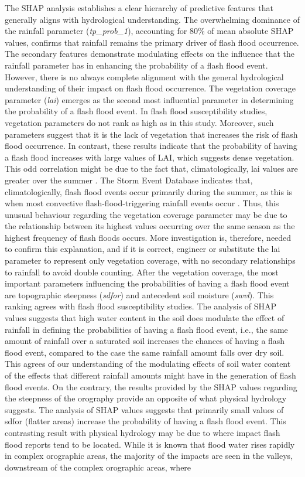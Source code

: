 \documentclass[nhess, manuscript]{copernicus}
\begin{document}
The SHAP analysis establishes a clear hierarchy of predictive features that generally aligns with hydrological understanding. The overwhelming dominance of the rainfall parameter (\textit{tp\_prob\_1}), accounting for 80\% of mean absolute SHAP values, confirms that rainfall remains the primary driver of flash flood occurrence. The secondary features demonstrate modulating effects on the influence that the rainfall parameter has in enhancing the probability of a flash flood event. However, there is no always complete alignment with the general hydrological understanding of their impact on flash flood occurrence. The vegetation coverage parameter (\textit{lai}) emerges as the second most influential parameter in determining the probability of a flash flood event. In flash flood susceptibility studies, vegetation parameters do not rank as high as in this study. Moreover, such parameters suggest that it is the lack of vegetation that increases the risk of flash flood occurrence. In contrast, these results indicate that the probability of having a flash flood increases with large values of LAI, which suggests dense vegetation. This odd correlation might be due to the fact that, climatologically, lai values are greater over the summer \citep{Owens_2018}. The Storm Event Database indicates that, climatologically, flash flood events occur primarily during the summer, as this is when most convective flash-flood-triggering rainfall events occur \citep{Davis_2001}. Thus, this unusual behaviour regarding the vegetation coverage parameter may be due to the relationship between its highest values occurring over the same season as the highest frequency of flash floods occurs. More investigation is, therefore, needed to confirm this explanation, and if it is correct, engineer or substitute the lai parameter to represent only vegetation coverage, with no secondary relationships to rainfall to avoid double counting. After the vegetation coverage, the most important parameters influencing the probabilities of having a flash flood event are topographic steepness (\textit{sdfor}) and antecedent soil moisture (\textit{swvl}). This ranking agrees with flash flood susceptibility studies. The analysis of SHAP values suggests that high water content in the soil does modulate the effect of rainfall in defining the probabilities of having a flash flood event, i.e., the same amount of rainfall over a saturated soil increases the chances of having a flash flood event, compared to the case the same rainfall amount falls over dry soil. This agrees of our understanding of the modulating effects of soil water content of the effects that different rainfall amounts might have in the generation of flash flood events. On the contrary, the results provided by the SHAP values regarding the steepness of the orography provide an opposite of what physical hydrology suggests. The analysis of SHAP values suggests that primarily small values of sdfor (flatter areas) increase the probability of having a flash flood event. This contrasting result with physical hydrology may be due to where impact flash flood reports tend to be located. While it is known that flood water rises rapidly in complex orographic areas, the majority of the impacts are seen in the valleys, downstream of the complex orographic areas, where 
\end{document}
